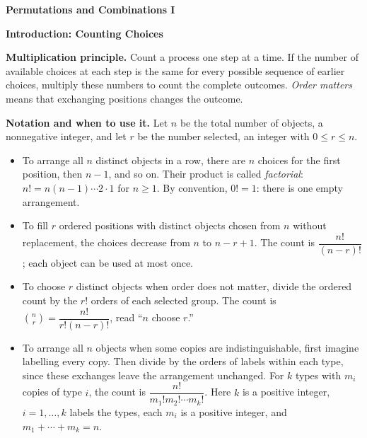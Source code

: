 \documentclass[11pt]{article}
\newcommand{\stageheading}[1]{%
  \par\Needspace{6\baselineskip}%
  \addvspace{.65\baselineskip}%
  {\centering\large\bfseries #1\par}%
  \nopagebreak[4]}
\begin{document}
\begingroup
\linespread{1}\selectfont
\setlength{\parskip}{2pt}
\setlength{\abovedisplayskip}{5pt plus 1pt minus 1pt}
\setlength{\belowdisplayskip}{5pt plus 1pt minus 1pt}
\setlength{\abovedisplayshortskip}{3pt plus 1pt}
\setlength{\belowdisplayshortskip}{3pt plus 1pt}
\renewcommand{\stageheading}[1]{%
  \par\Needspace{3\baselineskip}%
  \addvspace{.35\baselineskip}%
  {\centering\large\bfseries #1\par}%
  \nopagebreak[4]}

\vspace*{0pt}
{\centering\Large\bfseries Permutations and Combinations I\par}

\stageheading{Introduction: Counting Choices}

\textbf{Multiplication principle.} Count a process one step at a time.
If the number of available choices at each step is the same for every
possible sequence of earlier choices, multiply these numbers to count
the complete outcomes. \emph{Order matters} means that exchanging
positions changes the outcome.

\textbf{Notation and when to use it.} Let $n$ be the total number of
objects, a nonnegative integer, and let $r$ be the number selected,
an integer with $0\leq r\leq n$.
\begin{itemize}[leftmargin=*,itemsep=3pt,topsep=3pt,parsep=0pt]
\item To arrange all $n$ distinct objects in a row, there are $n$ choices
for the first position, then $n-1$, and so on. Their product is called
\emph{factorial}: $n!=n(n-1)\cdots2\cdot1$ for $n\geq1$.
By convention, $0!=1$: there is one empty arrangement.
\item To fill $r$ ordered positions with distinct objects chosen from $n$
without replacement, the choices decrease from $n$ to $n-r+1$.
The count is $\dfrac{n!}{(n-r)!}$; each object can be used at most once.
\item To choose $r$ distinct objects when order does not matter, divide
the ordered count by the $r!$ orders of each selected group. The count is
$\displaystyle\binom{n}{r}=\dfrac{n!}{r!(n-r)!}$, read ``$n$ choose $r$.''
\item To arrange all $n$ objects when some copies are indistinguishable,
first imagine labelling every copy. Then divide by the orders of labels
within each type, since these exchanges leave the arrangement unchanged.
For $k$ types with $m_i$ copies of type $i$, the count is
$\dfrac{n!}{m_1!m_2!\cdots m_k!}$.
Here $k$ is a positive integer, $i=1,\ldots,k$ labels the types, each
$m_i$ is a positive integer, and $m_1+\cdots+m_k=n$.
\end{itemize}
\end{document}
